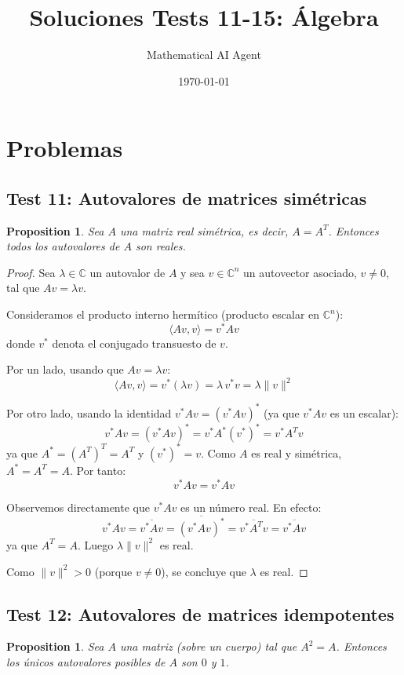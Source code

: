 \documentclass[11pt,a4paper]{article}
\title{Soluciones Tests 11-15: Álgebra}
\author{Mathematical AI Agent}
\date{\today}
\theoremstyle{plain}
\newtheorem{proposition}[theorem]{Proposition}
\theoremstyle{definition}
\begin{document}
\maketitle
\section{Problemas}

\subsection{Test 11: Autovalores de matrices simétricas}

\begin{proposition}
Sea $A$ una matriz real simétrica, es decir, $A = A^T$. Entonces todos los autovalores de $A$ son reales.
\end{proposition}

\begin{proof}
Sea $\lambda \in \mathbb{C}$ un autovalor de $A$ y sea $v \in \mathbb{C}^n$ un autovector asociado, $v \neq 0$, tal que $Av = \lambda v$.

Consideramos el producto interno hermítico (producto escalar en $\mathbb{C}^n$):
\[
\langle Av, v \rangle = v^* A v
\]
donde $v^*$ denota el conjugado transuesto de $v$.

Por un lado, usando que $Av = \lambda v$:
\[
\langle Av, v \rangle = v^* (\lambda v) = \lambda \, v^* v = \lambda \|v\|^2
\]

Por otro lado, usando la identidad $v^* Av = (v^* Av)^*$ (ya que $v^* Av$ es un escalar):
\[
v^* Av = (v^* Av)^* = v^* A^* (v^*)^* = v^* A^T v
\]
ya que $A^* = (A^T)^T = A^T$ y $(v^*)^* = v$. Como $A$ es real y simétrica, $A^* = A^T = A$. Por tanto:
\[
v^* Av = v^* Av
\]

Observemos directamente que $v^* Av$ es un número real. En efecto:
\[
v^* Av = \overline{v^* Av} = \overline{(v^* Av)^*} = \overline{v^* A^T v} = \overline{v^* Av}
\]
ya que $A^T = A$. Luego $\lambda \|v\|^2$ es real.

Como $\|v\|^2 > 0$ (porque $v \neq 0$), se concluye que $\lambda$ es real.
\end{proof}

\subsection{Test 12: Autovalores de matrices idempotentes}

\begin{proposition}
Sea $A$ una matriz (sobre un cuerpo) tal que $A^2 = A$. Entonces los únicos autovalores posibles de $A$ son $0$ y $1$.
\end{proposition}
\end{document}
